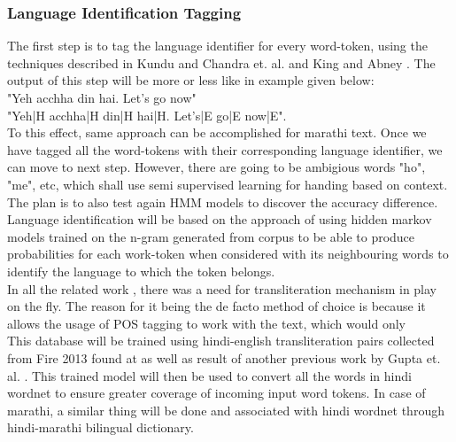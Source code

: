 \documentclass[12pt]{book}
\begin{document}
\subsubsection{Language Identification Tagging}
The first step is to tag the language identifier for every word-token, using the techniques described in Kundu and Chandra et. al.
\cite{kundu_automatic_2012} and King and Abney \cite{king_labeling_2013}. The
output of this step will be more or less like in example given below:\\

\hspace{8em}"Yeh acchha din hai. Let's go now" \\
\hspace{8em}"Yeh|H acchha|H din|H hai|H. Let's|E go|E now|E". \\
To this effect, same approach can be accomplished for marathi text. Once we have tagged all the
word-tokens with their corresponding language identifier, we can move to next
step. However, there are going to be ambigious words "ho", "me", etc, which
shall use semi supervised learning for handing based on context. The plan is to
also test again HMM models to discover the accuracy difference.\\

Language identification will be based on the approach of using hidden markov
models trained on the n-gram generated from corpus to be able to produce
probabilities for each work-token when considered with its neighbouring words
to identify the language to which the token belongs.\\

In all the related work \cite{shashank_sharma_sentiment_????}, there was a need
for transliteration mechanism in play on the fly. The reason for it being the
de facto method of choice is because it allows the usage of POS tagging to work
with the text, which would only \\
This database will be trained using hindi-english transliteration pairs
collected from Fire 2013 found at \cite{_linguistic_????} as well as result
of another previous work by Gupta et. al. \cite{gupta_mining_2012}. This
trained model will then be used to convert all the words in hindi wordnet to
ensure greater coverage of incoming input word tokens. In case of marathi, a
similar thing will be done and associated with hindi wordnet through
hindi-marathi bilingual dictionary.\\ 
\end{document}
